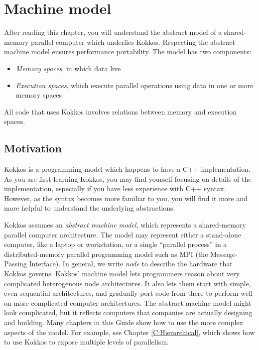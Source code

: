 \chapter{Machine model}\label{C:Model}

After reading this chapter, you will understand the abstract model of
a shared-memory parallel computer which underlies Kokkos.  
Respecting the abstract machine model ensures performance portability.
The model has two components:
\begin{itemize}
\item \emph{Memory spaces}, in which data live
\item \emph{Execution spaces}, which execute parallel operations using
  data in one or more memory spaces
\end{itemize}
All code that uses Kokkos involves relations between memory and execution spaces.

\section{Motivation}\label{S:Model:Motivation}

Kokkos is a programming model which happens to have a C++ implementation.
As you are first learning Kokkos,
you may find yourself focusing on details of the implementation,
especially if you have less experience with C++ syntax.
However, as the syntax becomes more familiar to you,
you will find it more and more helpful to understand the underlying abstractions.

Kokkos assumes an \emph{abstract machine model},
which represents a shared-memory parallel computer architecture.
The model may represent either a stand-alone computer,
like a laptop or workstation,
or a single ``parallel process'' in a distributed-memory parallel programming model such as MPI (the Message-Passing Interface).
In general, we write \emph{node} to describe the hardware that Kokkos governs.
Kokkos' machine model lets programmers reason about very complicated heterogenous node architectures.
It also lets them start with simple, even sequential architectures,
and gradually port code from there to perform well on more complicated computer architectures.
The abstract machine model might look complicated,
but it reflects computers that companies are actually designing and building.
Many chapters in this Guide show how to use the more complex aspects of the model.
For example, see Chapter \ref {C:Hierarchical},
which shows how to use Kokkos to expose multiple levels of parallelism.


